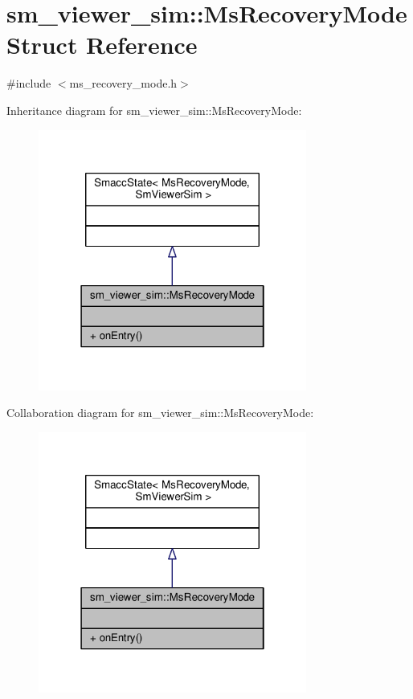 \hypertarget{structsm__viewer__sim_1_1MsRecoveryMode}{}\section{sm\+\_\+viewer\+\_\+sim\+:\+:Ms\+Recovery\+Mode Struct Reference}
\label{structsm__viewer__sim_1_1MsRecoveryMode}


{\ttfamily \#include $<$ms\+\_\+recovery\+\_\+mode.\+h$>$}



Inheritance diagram for sm\+\_\+viewer\+\_\+sim\+:\+:Ms\+Recovery\+Mode\+:
\nopagebreak
\begin{figure}[H]
\begin{center}
\leavevmode
\includegraphics[width=250pt]{structsm__viewer__sim_1_1MsRecoveryMode__inherit__graph}
\end{center}
\end{figure}


Collaboration diagram for sm\+\_\+viewer\+\_\+sim\+:\+:Ms\+Recovery\+Mode\+:
\nopagebreak
\begin{figure}[H]
\begin{center}
\leavevmode
\includegraphics[width=250pt]{structsm__viewer__sim_1_1MsRecoveryMode__coll__graph}
\end{center}
\end{figure}
